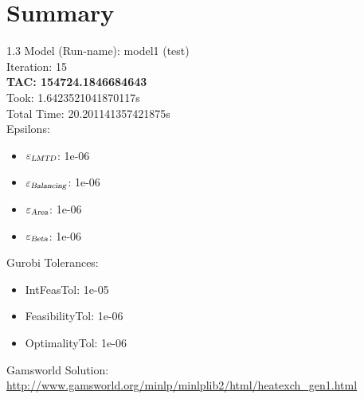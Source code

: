 \documentclass{article}%
\begin{document}
%
\normalsize%
\section{Summary}%
\thispagestyle{plain}%
\begin{spacing}{1.3}%
\Large%
Model (Run-name): model1 (test)\\%
Iteration: 15\\%
\textbf{TAC: 154724.1846684643}\\%
Took: 1.6423521041870117s\\%
Total Time: 20.201141357421875s\\%
Epsilons:%
\begin{itemize}%
	\item $\varepsilon_{\textsl{LMTD}}$: 1e-06%
	\item $\varepsilon_{\textsl{Balancing}}$: 1e-06%
	\item $\varepsilon_{\textsl{Area}}$: 1e-06%
	\item $\varepsilon_{\textsl{Beta}}$: 1e-06%
\end{itemize}%
Gurobi Tolerances:%
\begin{itemize}%
	\item IntFeasTol: 1e-05%
	\item FeasibilityTol: 1e-06%
	\item OptimalityTol: 1e-06%
\end{itemize}%
\end{spacing}%
\normalsize%
Gamsworld Solution: \url{http://www.gamsworld.org/minlp/minlplib2/html/heatexch_gen1.html}%
%
\clearpage%
\end{document}
